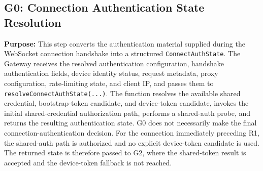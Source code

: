 \subsection*{G0: Connection Authentication State Resolution}

\textbf{Purpose:}
This step converts the authentication material supplied during the
WebSocket connection handshake into a structured
\texttt{ConnectAuthState}. The Gateway receives the resolved
authentication configuration, handshake authentication fields, device
identity status, request metadata, proxy configuration, rate-limiting
state, and client IP, and passes them to
\texttt{resolveConnectAuthState(...)}. The function resolves the
available shared credential, bootstrap-token candidate, and
device-token candidate, invokes the initial shared-credential
authorization path, performs a shared-auth probe, and returns the
resulting authentication state. G0 does not necessarily make the final
connection-authentication decision. For the connection immediately
preceding R1, the shared-auth path is authorized and no explicit
device-token candidate is used. The returned state is therefore passed to
G2, where the shared-token result is accepted and the device-token
fallback is not reached.

